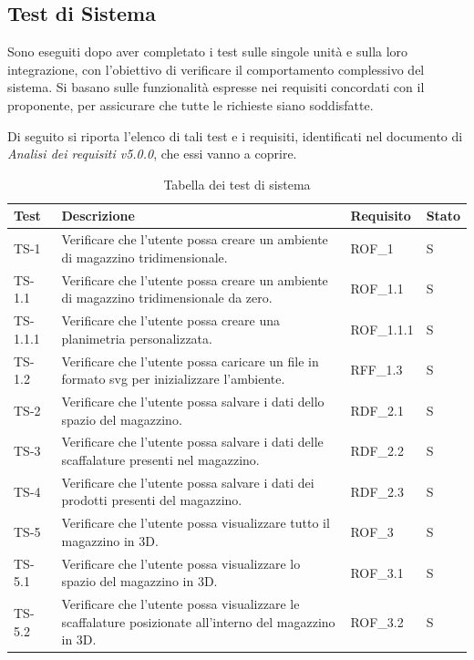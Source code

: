 \subsection{Test di Sistema}
\par Sono eseguiti dopo aver completato i test sulle singole unità e sulla loro integrazione, con l'obiettivo di verificare il comportamento complessivo del sistema. Si basano sulle funzionalità espresse nei requisiti concordati con il proponente, per assicurare che tutte le richieste siano soddisfatte.

Di seguito si riporta l'elenco di tali test e i requisiti, identificati nel documento di \textit{Analisi dei requisiti v5.0.0}, che essi vanno a coprire.
\renewcommand{\arraystretch}{1.5}
\begin{xltabular}{0.9\textwidth}{X | p{0.5\textwidth} | X | p{0.9cm}}
    \textbf{\color{white} Test} & \textbf{\color{white} Descrizione} & \textbf{\color{white} Requisito} & \textbf{\color{white} Stato}\\ 
    \hline
    \endhead
    \caption{Tabella dei test di sistema} 
    \label{tab:test_sistema}
    \endlastfoot
    TS-1 & Verificare che l'utente possa creare un ambiente di magazzino tridimensionale. & ROF\_1 & S\\
    TS-1.1 & Verificare che l'utente possa creare un ambiente di magazzino tridimensionale da zero. & ROF\_1.1 & S\\
    TS-1.1.1 & Verificare che l'utente possa creare una planimetria personalizzata. & ROF\_1.1.1 & S\\
    TS-1.2 & Verificare che l'utente possa caricare un file in formato svg per inizializzare l'ambiente. & RFF\_1.3 & S \\
    TS-2 & Verificare che l'utente possa salvare i dati dello spazio del magazzino.& RDF\_2.1 & S   \\
    TS-3 & Verificare che l'utente possa salvare i dati delle scaffalature presenti nel magazzino. & RDF\_2.2& S   \\
    TS-4 & Verificare che l'utente possa salvare i dati dei prodotti presenti del magazzino. & RDF\_2.3& S     \\
    TS-5 & Verificare che l'utente possa visualizzare tutto il magazzino in 3D.& ROF\_3 & S\\
    TS-5.1 & Verificare che l'utente possa visualizzare lo spazio del magazzino in 3D. & ROF\_3.1& S\\
    TS-5.2 & Verificare che l'utente possa visualizzare le scaffalature posizionate all'interno del magazzino in 3D. & ROF\_3.2& S\\

\end{xltabular}
